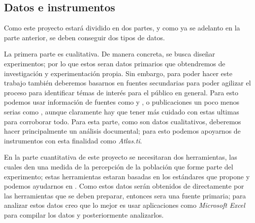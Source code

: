 \documentclass[12pt]{article}
\begin{document}
	
	\subsection {Datos e instrumentos}
		\par Como este proyecto estará dividido en dos partes, y como ya se adelanto en la parte anterior, se deben conseguir dos tipos de datos. 
		\par La primera parte es cualitativa. De manera concreta, se busca diseñar experimentos; por lo que estos seran datos primarios que obtendremos de investigación y experimentación propia. Sin embargo, para poder hacer este trabajo también deberemos basarnos en fuentes secundarias para poder agilizar el proceso para identificar témas de interés para el público en general. Para esto podemos usar información de fuentes como \cite{biot vida 1} y \cite{biot vida 2}, o publicaciones un poco menos serias como \cite{biot informal}, aunque claramente hay que tener más cuidado con estas ultimas para corroborar todo. Para esta parte, como son datos cualitativos, deberemos hacer principalmente un análisis documental; para esto podemos apoyarnos de instrumentos con esta finalidad como \textit{Atlas.ti}.
		\par En la parte cuantitativa de este proyecto se necesitaran dos herramientas, las cuales den una medida de la percepción de la población que forme parte del experimento; estas herramientas estaran basadas en los estándares que propone \cite{instrumento 1} y podemos ayudarnos en \cite{instrumento 2}. Como estos datos serán obtenidos de directamente por las herramientas que se deben preparar, entonces sera una fuente primaria; para analizar estos datos creo que lo mejor es usar aplicaciones como \textit{Microsoft Excel} para compilar los datos y posteriormente analizarlos.
\end{document}
